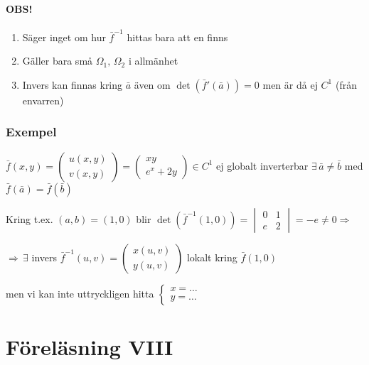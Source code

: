 \documentclass[a4paper]{article}
\let\olddet\det
\renewcommand*{\det}[1]{\olddet(#1)}
\begin{document}
\paragraph{OBS!}
\begin{enumerate}
\item Säger inget om hur $\bar{f}^{-1}$ hittas bara att en finns
\item Gäller bara små $\Omega_1, \,\Omega_2$ i allmänhet
\item Invers kan finnas kring $\bar{a}$ även om $\det{\bar{f}'(\bar{a})} = 0$ men är då ej $C^1$ (från envarren)
\end{enumerate}

\subsubsection{Exempel}
$\bar{f}(x,y) =
\begin{pmatrix}
	u(x,y) \\
	v(x,y)
\end{pmatrix} =
\begin{pmatrix}
	xy \\
	e^x + 2y
\end{pmatrix} \in C^1
$
ej globalt inverterbar \newline
$\exists \, \bar{a} \neq \bar{b}$ med $\bar{f}(\bar{a}) = \bar{f}(\bar{b})$ \newline

Kring t.ex. $(a,b) = (1,0)$ blir $\det{\bar{f}^{-1}(1,0)} =
\begin{vmatrix}
	0 & 1 \\
	e & 2
\end{vmatrix} = -e \neq 0 \Rightarrow $ \newline

$\Rightarrow \, \exists$ invers $\bar{f}^{-1}(u,v) =
\begin{pmatrix}
	x(u,v) \\
	y(u,v)
\end{pmatrix}$ lokalt kring $\bar{f}(1,0)$ \newline

men vi kan inte uttryckligen hitta $\begin{cases}
x = \ldots \\
y = \ldots
\end{cases}$





\newpage
\section{Föreläsning VIII}
\end{document}

